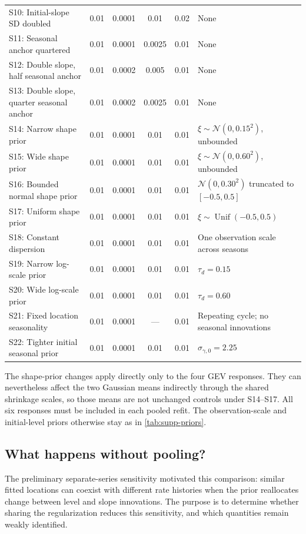 \documentclass[11pt,a4paper]{article}
\newcommand{\N}{\mathcal N}
\begin{document}
\begin{longtable}{@{}>{\raggedright\arraybackslash}p{3.25cm}cccc>{\raggedright\arraybackslash}p{5.1cm}@{}}
		S10: Initial-slope SD doubled & 0.01 & 0.0001 & 0.01 & 0.02 & None \\
		S11: Seasonal anchor quartered & 0.01 & 0.0001 & 0.0025 & 0.01 & None \\
		S12: Double slope, half seasonal anchor & 0.01 & 0.0002 & 0.005 & 0.01 & None \\
		S13: Double slope, quarter seasonal anchor & 0.01 & 0.0002 & 0.0025 & 0.01 & None \\
		\addlinespace
		S14: Narrow shape prior & 0.01 & 0.0001 & 0.01 & 0.01 & \(\xi\sim\N(0,0.15^2)\), unbounded \\
		S15: Wide shape prior & 0.01 & 0.0001 & 0.01 & 0.01 & \(\xi\sim\N(0,0.60^2)\), unbounded \\
		S16: Bounded normal shape prior & 0.01 & 0.0001 & 0.01 & 0.01 & \(\N(0,0.30^2)\) truncated to \([-0.5,0.5]\) \\
		S17: Uniform shape prior & 0.01 & 0.0001 & 0.01 & 0.01 & \(\xi\sim\operatorname{Unif}(-0.5,0.5)\) \\
		\addlinespace
		S18: Constant dispersion & 0.01 & 0.0001 & 0.01 & 0.01 & One observation scale across seasons \\
		S19: Narrow log-scale prior & 0.01 & 0.0001 & 0.01 & 0.01 & \(\tau_d=0.15\) \\
		S20: Wide log-scale prior & 0.01 & 0.0001 & 0.01 & 0.01 & \(\tau_d=0.60\) \\
		S21: Fixed location seasonality & 0.01 & 0.0001 & --- & 0.01 & Repeating cycle; no seasonal innovations \\
		S22: Tighter initial seasonal prior & 0.01 & 0.0001 & 0.01 & 0.01 & \(\sigma_{\gamma,0}=2.25\) \\
	\end{longtable}
	\endgroup

The shape-prior changes apply directly only to the four GEV responses.
They can nevertheless affect the two Gaussian means indirectly through
the shared shrinkage scales, so those means are not unchanged controls
under S14--S17. All six responses must be included in each pooled refit.
The observation-scale and initial-level priors otherwise stay as in
\cref{tab:supp-priors}.

\subsection{What happens without pooling?}
\label{supp:unpooled}

The preliminary separate-series sensitivity motivated this comparison:
similar fitted locations can coexist with different rate histories when
the prior reallocates change between level and slope innovations.
The purpose is to determine whether sharing the regularization reduces
this sensitivity, and which quantities remain weakly identified.
\end{document}
